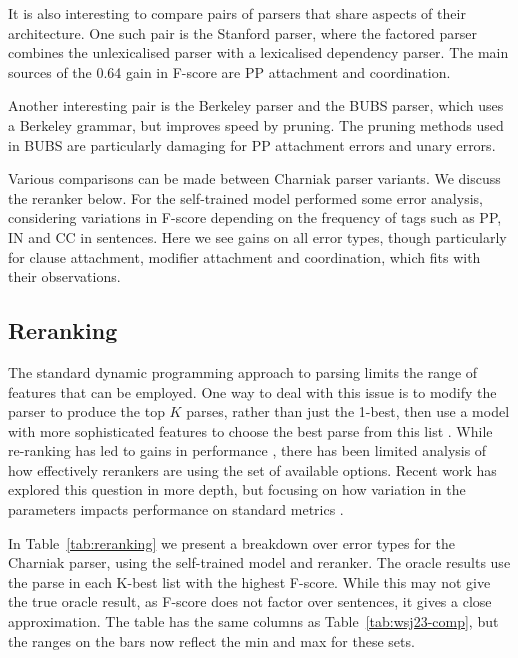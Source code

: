 It is also interesting to compare pairs of parsers that share aspects of their
architecture.  One such pair is the Stanford parser, where the factored parser
combines the unlexicalised parser with a lexicalised dependency parser.  The
main sources of the 0.64 gain in F-score are PP attachment and coordination.

Another interesting pair is the Berkeley parser and the BUBS parser, which uses
a Berkeley grammar, but improves speed by pruning.  The pruning methods used in
BUBS are particularly damaging for PP attachment errors and unary errors.

Various comparisons can be made between Charniak parser variants.  We discuss
the reranker below.  For the self-trained model
\textcite{McClosky-Charniak-Johnson:2006} performed some error analysis,
considering variations in F-score depending on the frequency of tags such as
PP, IN and CC in sentences.  Here we see gains on all error types, though
particularly for clause attachment, modifier attachment and coordination, which
fits with their observations.

\subsection{Reranking}

The standard dynamic programming approach to parsing limits the range of
features that can be employed.  One way to deal with this issue is to modify
the parser to produce the top $K$ parses, rather than just the 1-best, then use
a model with more sophisticated features to choose the best parse from this
list \parencite{collins:00}.  While re-ranking has led to gains in performance
\parencite{Charniak-Johnson:2005}, there has been limited analysis of how
effectively rerankers are using the set of available options.  Recent work has
explored this question in more depth, but focusing on how variation in the
parameters impacts performance on standard metrics
\parencite{huang:08a,Ng-etal:2010,Auli-Lopez:2011,Ng-Curran:2012}.

\begin{landscape}

\end{landscape}

In Table~\ref{tab:reranking} we present a breakdown over error types for the
Charniak parser, using the self-trained model and reranker.  The oracle results
use the parse in each K-best list with the highest F-score.  While this may not
give the true oracle result, as F-score does not factor over sentences, it
gives a close approximation.  The table has the same columns as
Table~\ref{tab:wsj23-comp}, but the ranges on the bars now reflect the min and
max for these sets.

